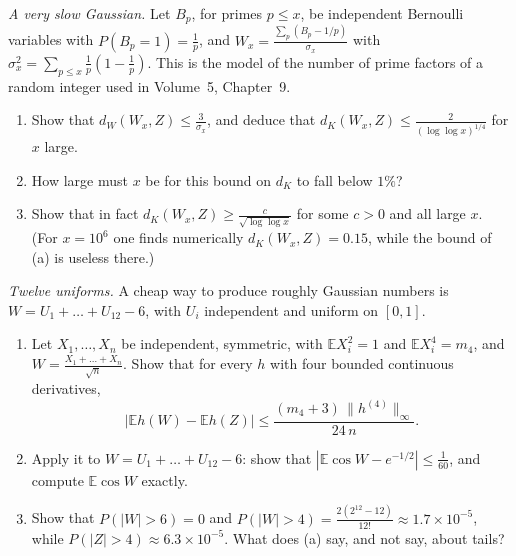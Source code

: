 \begin{exercise}[$\star$]\label{pb:kubslow}
\emph{A very slow Gaussian.} Let $B_p$, for primes $p\le x$, be independent Bernoulli variables with $P(B_p=1)=\frac1p$, and $W_x=\frac{\sum_p(B_p-1/p)}{\sigma_x}$ with
$\sigma_x^2=\sum_{p\le x}\frac1p(1-\frac1p)$. This is the model of the number of prime factors of a random integer used in Volume~5, Chapter~9.
\begin{enumerate}[label=(\alph*)]
\item Show that $d_W(W_x,Z)\le\frac3{\sigma_x}$, and deduce that $d_K(W_x,Z)\le\frac{2}{(\log\log x)^{1/4}}$ for $x$ large.
\item How large must $x$ be for this bound on $d_K$ to fall below $1\%$?
\item Show that in fact $d_K(W_x,Z)\ge\frac c{\sqrt{\log\log x}}$ for some $c>0$ and all large $x$. (For $x=10^6$ one finds numerically $d_K(W_x,Z)=0.15$, while the bound of (a) is useless there.)
\end{enumerate}
\end{exercise}

\begin{exercise}[$\star\star$]\label{pb:twelve}
\emph{Twelve uniforms.} A cheap way to produce roughly Gaussian numbers is $W=U_1+\dots+U_{12}-6$, with $U_i$ independent and uniform on $[0,1]$.
\begin{enumerate}[label=(\alph*)]
\item Let $X_1,\dots,X_n$ be independent, symmetric, with $\mathbb EX_i^2=1$ and $\mathbb EX_i^4=m_4$, and $W=\frac{X_1+\dots+X_n}{\sqrt n}$. Show that for every $h$ with four
bounded continuous derivatives,
\[
\bigl|\mathbb Eh(W)-\mathbb Eh(Z)\bigr|\le\frac{(m_4+3)\,\|h^{(4)}\|_\infty}{24\,n}.
\]
\item Apply it to $W=U_1+\dots+U_{12}-6$: show that $|\mathbb E\cos W-e^{-1/2}|\le\frac1{60}$, and compute $\mathbb E\cos W$ exactly.
\item Show that $P(|W|>6)=0$ and $P(|W|>4)=\frac{2(2^{12}-12)}{12!}\approx1.7\times10^{-5}$, while $P(|Z|>4)\approx6.3\times10^{-5}$. What does (a) say, and not say, about tails?
\end{enumerate}
\end{exercise}

